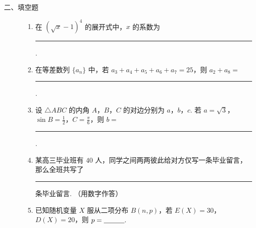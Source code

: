 \begin{description}

    \item[二、填空题]

    \begin{enumerate}[leftmargin=5pt]

      \addtocounter{enumi}{+8}

        \item 在 \((\sqrt{x} - 1)^4\) 的展开式中，\(x\) 的系数为\rule[-0.3ex]{3em}{0.4pt}.

        \item 在等差数列 \(\{a_n\}\) 中，若 \(a_3 + a_4 + a_5 + a_6 + a_7 = 25\)，则 \(a_2 + a_8 =\)\rule[-0.3ex]{3em}{0.4pt}.

        \item 设 \(\triangle ABC\) 的内角 \(A\)，\(B\)，\(C\) 的对边分别为 \(a\)，\(b\)，\(c\). 若 \(a = \sqrt{3}\)，\(\sin B = \frac{1}{2}\)，\(C = \frac{\pi}{6}\)，则 \(b =\)\rule[-0.3ex]{3em}{0.4pt}.

        \item 某高三毕业班有 \(40\) 人，同学之间两两彼此给对方仅写一条毕业留言，那么全班共写了\rule[-0.3ex]{3em}{0.4pt} 条毕业留言. （用数字作答）

        \item 已知随机变量 \(X\) 服从二项分布 \(B(n,p)\)，若 \(E(X)=30\)，\(D(X)=20\)，则 \(p =\rule[-0.3ex]{3em}{0.4pt}.\)

    \end{enumerate}

\end{description}

